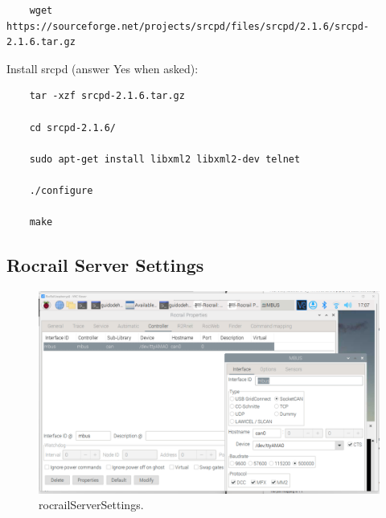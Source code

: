 \begin{verbatim}
	wget https://sourceforge.net/projects/srcpd/files/srcpd/2.1.6/srcpd-2.1.6.tar.gz
\end{verbatim}

Install srcpd (answer Yes when asked):

\begin{verbatim}
	tar -xzf srcpd-2.1.6.tar.gz
	
	cd srcpd-2.1.6/
	
	sudo apt-get install libxml2 libxml2-dev telnet
	
	./configure
	
	make
\end{verbatim}

\subsection{Rocrail Server Settings}



\begin{figure}[h!]
	\centering
	\includegraphics[width=1.00\linewidth]{../figures/rocrailServerSettings.png}
	\caption{rocrailServerSettings.}
	\label{fig:rocrailServerSettings}
\end{figure}


